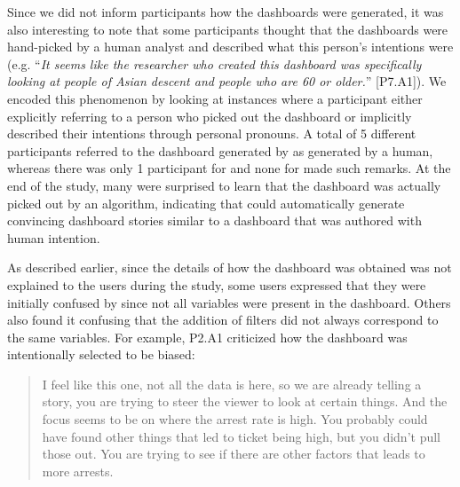 \par Since we did not inform participants how the dashboards were generated, it was also interesting to note that some participants thought that the dashboards were hand-picked by a human analyst and described what this person's intentions were (e.g. ``\textit{It seems like the researcher who created this dashboard was specifically looking at people of Asian descent and people who are 60 or older.}'' [P7.A1]). We encoded this phenomenon by looking at instances where a participant either explicitly referring to a person who picked out the dashboard or implicitly described their intentions through personal pronouns. A total of 5 different participants referred to the dashboard generated by \system as generated by a human, whereas there was only 1 participant for \cluster and none for \BFS made such remarks. At the end of the study, many were surprised to learn that the \system dashboard was actually picked out by an algorithm, indicating that \system could automatically generate convincing dashboard stories similar to a dashboard that was authored with human intention.
\par As described earlier, since the details of how the dashboard was obtained was not explained to the users during the study, some users expressed that they were initially confused by \system since not all variables were present in the dashboard. Others also found it confusing that the addition of filters did not always correspond to the same variables. For example, P2.A1 criticized how the dashboard was intentionally selected to be biased:
\begin{quote}
I feel like this one, not all the data is here, so we are already telling a story, you are trying to steer the viewer to look at certain things. And the focus seems to be on where the arrest rate is high. You probably could have found other things that led to ticket being high, but you didn't pull those out. You are trying to see if there are other factors that leads to more arrests.
\end{quote}
